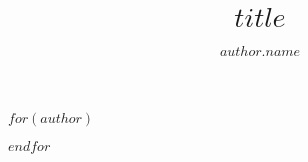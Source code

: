 \documentclass[sigconf,screen]{acmart}
\begin{document}
\title{$title$}


$for(author)$
\author{ $author.name$ }
$endfor$

%
%
%
%
%
%
%

\renewcommand{\shortauthors}{Kavalar, Markovics, Rusher}
\end{document}
